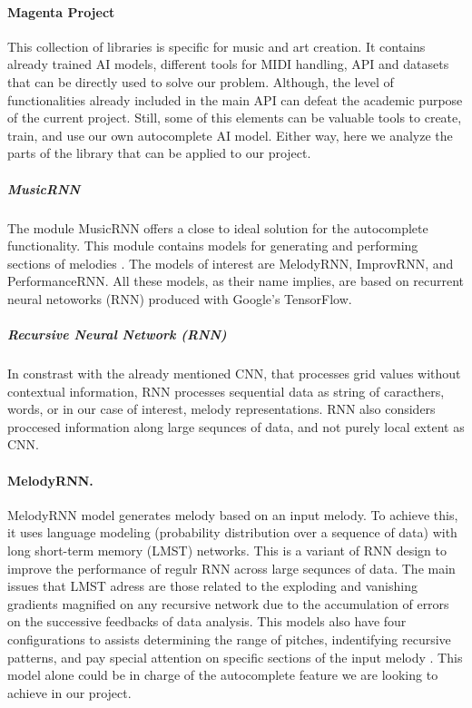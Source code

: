 \paragraph{Magenta Project} This collection of libraries is specific for music and art
creation. It contains already trained AI models, different tools for MIDI handling, API
and datasets that can be directly used to solve our problem. Although, the level of
functionalities already included in the main API can defeat the academic purpose of the
current project. Still, some of this elements can be valuable tools to create, train, and
use our own autocomplete AI model. Either way, here we analyze the parts of the library that
can be applied to our project.

\subparagraph{MusicRNN} The module MusicRNN offers a close to ideal solution for the
autocomplete functionality. This module contains models for generating and performing
sections of melodies \autocite{musicRNN}. The models of interest are MelodyRNN, ImprovRNN,
and PerformanceRNN. All these models, as their name implies, are based on recurrent neural
netoworks (RNN) produced with Google's TensorFlow.

\subparagraph{Recursive Neural Network (RNN)} In constrast with the already mentioned CNN,
that processes grid values without contextual information, RNN processes sequential data
as string of caracthers, words, or in our case of interest, melody representations. RNN
also considers proccesed information along large sequnces of data, and not purely local
extent as CNN.\autocite{fundamentalML}

\paragraph{MelodyRNN.}
MelodyRNN model generates melody based on an input melody. To achieve this, it uses
language modeling (probability distribution over a sequence of data) with long short-term
memory (LMST) networks. This is a variant of RNN design to improve the performance of
regulr RNN across large sequnces of data. The main issues that LMST adress are those
related to the exploding and vanishing gradients magnified on any recursive network due to
the accumulation of errors on the successive feedbacks of data analysis. This models also
have four configurations to assists determining the range of pitches, indentifying
recursive patterns, and pay special attention on specific sections of the input melody
\autocite{melodyRNN}. This model alone could be in charge of the autocomplete feature we
are looking to achieve in our project.

